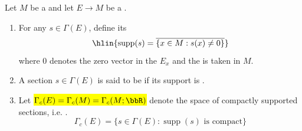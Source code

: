
\begin{definition} \label{definition:support_of_a_section_of_a_C_k_vector_bundle_over_a_C_k_manifold}
Let $M$ be a  and let $E \to M$ be a . 
\begin{enumerate}
    \item For any  $s \in \Gamma(E)$, define its   
    $$ \hlin{\operatorname{supp}(s) = \overline{ \left\{ x \in M : s(x) \neq 0 \right\} } }$$
    where $0$ denotes the zero vector in the  $E_x$ and the  is taken in $M$.

    \item A section $s \in \Gamma(E)$ is said to be  if its support is .
    
    \item Let \hl{$\Gamma_c(E) = \Gamma_c(M) = \Gamma_c(M;\bbR)$} denote the space of compactly supported sections, i.e. .
    $$\Gamma_c(E) = \{s \in \Gamma(E): \operatorname{supp}(s) \text{ is compact}\}$$
\end{enumerate}
\end{definition}
